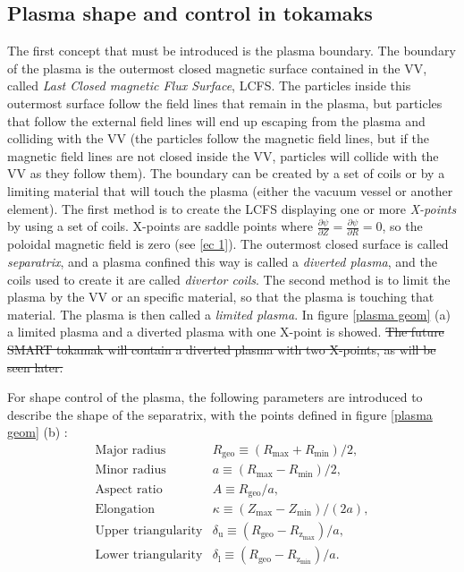 \documentclass[a4paper,12pt,oneside]{book}
\newcommand{\p}{\partial}
\begin{document}
\subsection{Plasma shape and control in tokamaks}
\label{section_shape}

The first concept that must be introduced is the plasma boundary. The boundary of the plasma is the outermost closed magnetic surface contained in the VV, called \textit{Last Closed magnetic Flux Surface}, LCFS. The particles inside this outermost surface follow the field lines that remain in the plasma, but particles that follow the external field lines will end up escaping from the plasma and colliding with the VV (the particles follow the magnetic field lines, but if the magnetic field lines are not closed inside the VV, particles will collide with the VV as they follow them). The boundary can be created by a set of coils or by a limiting material that will touch the plasma (either the vacuum vessel or another element). The first method is to create the LCFS displaying one or more \textit{X-points} by using a set of coils. X-points are saddle points where $\frac{\p \psi}{\p Z}=\frac{\p \psi}{\p R}=0$, so the poloidal magnetic field is zero (see \eqref{ec 1}). The outermost closed surface is called \textit{separatrix}, and a plasma confined this way is called a \textit{diverted plasma}, and the coils used to create it are called \textit{divertor coils}. The second method is to limit the plasma by the VV or an specific material, so that the plasma is touching that material. The plasma is then called a \textit{limited plasma}. In figure \ref{plasma geom} (a) a limited plasma and a diverted plasma with one X-point is showed. \st{The future SMART tokamak will contain a diverted plasma with two X-points, as will be seen later.}

For shape control of the plasma, the following parameters are introduced to describe the shape of the separatrix, with the points defined in figure \ref{plasma geom} (b) \cite{Luce_2013}:
%
\begin{equation}\label{ec shape}
\begin{array}{cc}
\text{Major radius} & R_\text{geo} \equiv (R_\text{max}+R_\text{min})/2, 
\\
\text{Minor radius} & a \equiv (R_\text{max}-R_\text{min})/2,
\\
\text{Aspect ratio} & A \equiv R_\text{geo}/a,
\\
\text{Elongation} & \kappa \equiv (Z_\text{max}-Z_\text{min})/(2a),
\\
\text{Upper triangularity} & \delta_\text{u} \equiv (R_\text{geo}-R_{\text{z}_\text{max}})/a,
\\
\text{Lower triangularity} & \delta_\text{l} \equiv (R_\text{geo}-R_{\text{z}_\text{min}})/a.
\end{array}
\end{equation}
\end{document}
